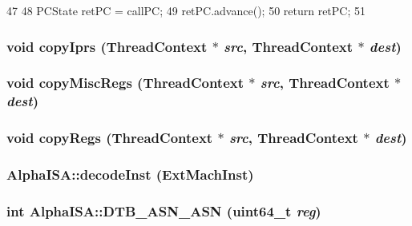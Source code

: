 \begin{DoxyCode}
47 {
48     PCState retPC = callPC;
49     retPC.advance();
50     return retPC;
51 }
\end{DoxyCode}
\hypertarget{namespaceAlphaISA_a42c226b069903e985920fe085c8d7a81}{
\subsubsection[{copyIprs}]{\setlength{\rightskip}{0pt plus 5cm}void copyIprs ({\bf ThreadContext} $\ast$ {\em src}, \/  {\bf ThreadContext} $\ast$ {\em dest})}}
\label{namespaceAlphaISA_a42c226b069903e985920fe085c8d7a81}
\hypertarget{namespaceAlphaISA_a42833096094e5ff0f2de948bf8e5965c}{
\subsubsection[{copyMiscRegs}]{\setlength{\rightskip}{0pt plus 5cm}void copyMiscRegs ({\bf ThreadContext} $\ast$ {\em src}, \/  {\bf ThreadContext} $\ast$ {\em dest})}}
\label{namespaceAlphaISA_a42833096094e5ff0f2de948bf8e5965c}
\hypertarget{namespaceAlphaISA_aaeffcccf262b0dbd3cbcc8b4cef41168}{
\subsubsection[{copyRegs}]{\setlength{\rightskip}{0pt plus 5cm}void copyRegs ({\bf ThreadContext} $\ast$ {\em src}, \/  {\bf ThreadContext} $\ast$ {\em dest})}}
\label{namespaceAlphaISA_aaeffcccf262b0dbd3cbcc8b4cef41168}
\hypertarget{namespaceAlphaISA_aef30743e4d38e3498eb69d368026c8f8}{
\subsubsection[{decodeInst}]{ AlphaISA::decodeInst (ExtMachInst)}}
\label{namespaceAlphaISA_aef30743e4d38e3498eb69d368026c8f8}
\hypertarget{namespaceAlphaISA_a36b44188d4a889f9397dca5549e44a54}{
\subsubsection[{DTB\_\-ASN\_\-ASN}]{\setlength{\rightskip}{0pt plus 5cm}int AlphaISA::DTB\_\-ASN\_\-ASN (uint64\_\-t {\em reg})}}
\label{namespaceAlphaISA_a36b44188d4a889f9397dca5549e44a54}



